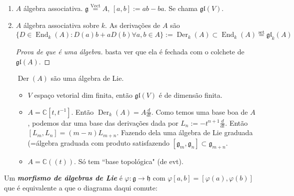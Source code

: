 \begin{example}\leavevmode
\begin{enumerate}
	\item \(A\) álgebra associativa. \(\mathfrak{g}\overset{\operatorname{Vect}}{=}A\),  \([a,b]:=ab-ba\). Se chama \(\mathfrak{gl}(V)\).
	\item \(A\) álgebra associativa sobre \(k\). As derivações de \(A\) são
		\[\{D \in \operatorname{End}_k(A):D(a)b+aD(b)\forall a,b \in A\}:=\operatorname{Der}_k(A) \subset \operatorname{End}_k(A) \overset{\operatorname{s e t}}{=}\mathfrak{gl}_k(A)\]
	\begin{proof}[Prova de que é uma álgebra]\leavevmode
	basta ver que ela é fechada com o colchete de \(\mathfrak{gl}(A)\).
	\end{proof}	
	\begin{coro}\leavevmode
	\(\operatorname{Der}(A)\) são uma álgebra de Lie.
	\end{coro}
\begin{itemize}
\item  \(V\) espaço vetorial dim finita, então \(\mathfrak{gl}(V)\) é de dimensão finita.
\item \(A=\mathbb{C}[t,t^{-1}]\). Então \(\operatorname{Der}_k(A)=A \frac{d}{dt}\). Como temos uma base boa de \(A\), podemos dar uma base das derivações dada por \(L_n:=-t^{n+1}\frac{d}{dt}\). Então \([L_m,L_n]=(m-n)L_{m+n}\). Fazendo dela uma álgebra de Lie graduada (=álgebra graduada com produto satisfazendo \([\mathfrak{g}_m,\mathfrak{g}_n]\subset \mathfrak{g}_{m+n}\).

\item \(A=\mathbb{C}((t))\). Só tem ``base topológica" (de evt).
\end{itemize}
\end{enumerate}
\end{example}


\begin{defn}\leavevmode
	Um \textit{\textbf{morfismo de álgebras de Lie}} é \(\varphi:\mathfrak{g} \to \mathfrak{h}\) com \(\varphi[a,b]=[\varphi(a),\varphi(b)]\) que é equivalente a que o diagrama daqui comute:
\end{defn}

